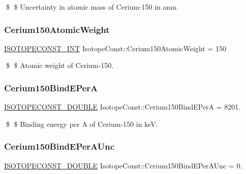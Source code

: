 \$ \$ Uncertainty in atomic mass of Cerium-\/150 in amu. \mbox{\label{group___isotope_const-_cerium-_ce150_ga81ecb5e7de02f0343a4fad44a26410c9}} 
\subsubsection{\texorpdfstring{Cerium150\+Atomic\+Weight}{Cerium150AtomicWeight}}
{\footnotesize\ttfamily \mbox{\hyperlink{group___isotope_const-_macros_ga5f18360b3e99483a35c32d789e62621c}{I\+S\+O\+T\+O\+P\+E\+C\+O\+N\+S\+T\+\_\+\+I\+NT}} Isotope\+Const\+::\+Cerium150\+Atomic\+Weight = 150}

\$ \$ Atomic weight of Cerium-\/150. \mbox{\label{group___isotope_const-_cerium-_ce150_gab300cc1eb866691797d7fcf954d3e7d4}} 
\subsubsection{\texorpdfstring{Cerium150\+Bind\+E\+PerA}{Cerium150BindEPerA}}
{\footnotesize\ttfamily \mbox{\hyperlink{group___isotope_const-_macros_ga8f45a7272ce02c0b4c65c44636ed719a}{I\+S\+O\+T\+O\+P\+E\+C\+O\+N\+S\+T\+\_\+\+D\+O\+U\+B\+LE}} Isotope\+Const\+::\+Cerium150\+Bind\+E\+PerA = 8201.}

\$ \$ Binding energy per A of Cerium-\/150 in keV. \mbox{\label{group___isotope_const-_cerium-_ce150_ga0424dc01674c53f487b5e59006ae086b}} 
\subsubsection{\texorpdfstring{Cerium150\+Bind\+E\+Per\+A\+Unc}{Cerium150BindEPerAUnc}}
{\footnotesize\ttfamily \mbox{\hyperlink{group___isotope_const-_macros_ga8f45a7272ce02c0b4c65c44636ed719a}{I\+S\+O\+T\+O\+P\+E\+C\+O\+N\+S\+T\+\_\+\+D\+O\+U\+B\+LE}} Isotope\+Const\+::\+Cerium150\+Bind\+E\+Per\+A\+Unc = 0.}


